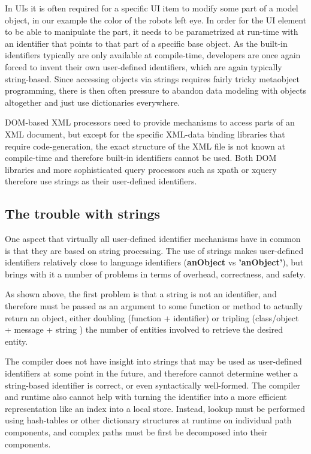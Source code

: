 \documentclass[preprint,authoryear]{acm_proc_article-sp}
\begin{document}
In UIs it is often required for
a specific UI item to modify some part of a model object, in our
example the color of the robots left eye.  In order for the UI element to be
able to manipulate the part, it needs to be parametrized at run-time with
an identifier that points to that part of a specific base object.   As the built-in
 identifiers typically are only available at compile-time, developers are
 once again forced to invent their own user-defined identifiers, which are again 
 typically string-based.  Since accessing objects via strings requires fairly tricky
 metaobject programming, there is then often pressure to abandon data
 modeling with objects altogether and just use dictionaries everywhere.

DOM-based XML processors need to provide mechanisms to access parts of
an XML document, but except for the specific XML-data binding libraries that
require code-generation, the exact structure of the XML file is not known at 
compile-time and therefore built-in identifiers cannot be used.  Both DOM libraries
and more sophisticated query processors such as xpath or xquery therefore use
strings as their user-defined identifiers.


\subsection{The trouble with strings}
\label{stringtrouble}

One aspect that virtually all user-defined identifier mechanisms have in common is that they
are based on string processing.  The use of strings makes user-defined identifiers relatively
close to language identifiers ({\bf \hbox{anObject}} vs {\bf \hbox{'anObject'}}), but brings with it a number of problems in terms of overhead, correctness, and safety.

As shown above, the first problem is that a string is not an identifier, and therefore
must be passed as an argument to some function or method to actually return
 an object, either doubling (function + identifier) or tripling (class/object + message + string ) the number of entities involved to retrieve the desired entity.  

The compiler does not have insight into strings that may be used as user-defined 
identifiers at some point in the future, and therefore cannot determine wether 
a string-based identifier is correct, or even syntactically well-formed.   The compiler
and runtime also cannot help with turning the identifier into a more efficient representation
like an index into a local store.  Instead, lookup must be performed using hash-tables
or other dictionary structures at runtime on individual path components, 
and complex paths must be first be decomposed into their components.
\end{document}
